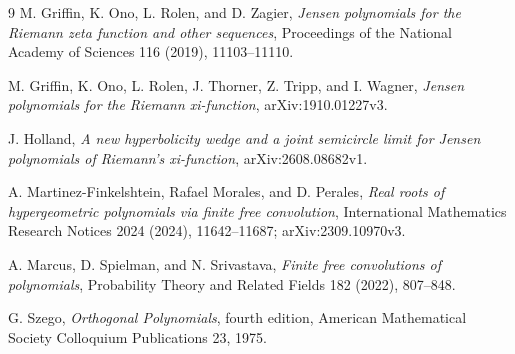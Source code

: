\documentclass[11pt]{article}
\theoremstyle{definition}
\theoremstyle{remark}
\begin{document}
\begin{thebibliography}{9}
M. Griffin, K. Ono, L. Rolen, and D. Zagier,
\emph{Jensen polynomials for the Riemann zeta function and other sequences},
Proceedings of the National Academy of Sciences 116 (2019), 11103--11110.

M. Griffin, K. Ono, L. Rolen, J. Thorner, Z. Tripp, and I. Wagner,
\emph{Jensen polynomials for the Riemann xi-function},
arXiv:1910.01227v3.

J. Holland,
\emph{A new hyperbolicity wedge and a joint semicircle limit for Jensen
polynomials of Riemann's xi-function}, arXiv:2608.08682v1.

A. Martinez-Finkelshtein, Rafael Morales, and D. Perales,
\emph{Real roots of hypergeometric polynomials via finite free convolution},
International Mathematics Research Notices 2024 (2024), 11642--11687;
arXiv:2309.10970v3.

A. Marcus, D. Spielman, and N. Srivastava,
\emph{Finite free convolutions of polynomials},
Probability Theory and Related Fields 182 (2022), 807--848.

G. Szego, \emph{Orthogonal Polynomials}, fourth edition,
American Mathematical Society Colloquium Publications 23, 1975.
\end{thebibliography}
\end{document}
